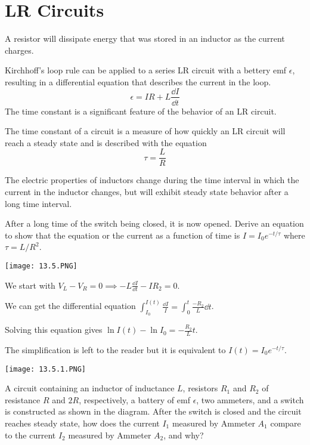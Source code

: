 \documentclass[../em.tex]{subfiles}
\begin{document}
\section{LR Circuits}
A resistor will dissipate energy that was stored in an inductor as the current charges.

Kirchhoff's loop rule can be applied to a series LR circuit with a bettery emf $\epsilon$, resulting in a differential equation that describes the current in the loop.
\[ \epsilon = IR + L\frac{\dd I}{\dd t}\]
The time constant is a significant feature of the behavior of an LR circuit.

The time constant of a circuit is a measure of how quickly an LR circuit will reach a steady state and is described with the equation 
\[ \tau = \frac{L}{R}\]

The electric properties of inductors change during the time interval in which the current in the inductor changes, but will 
exhibit steady state behavior after a long time interval.

\begin{example}
    After a long time of the switch being closed, it is now opened. Derive an equation to show that the equation or the current as a function of time is $I=I_0e^{-t/\tau}$ where $\tau=L/R^2$.
    \begin{center}
        \texttt{[image: 13.5.PNG]}
    \end{center}

    We start with $V_L-V_R = 0 \implies -L\frac{\dd I}{\dd t}-IR_2=0$.

    We can get the differential equation $\int_{I_0}^{I(t)}\frac{\dd I}{I}=\int_0^t \frac{-R_2}{L}\dd t$.
    
    Solving this equation gives $\ln I(t)-\ln I_0=-\frac{R_2}{L}t$.

    The simplification is left to the reader but it is equivalent to $I(t)=I_0e^{-t/\tau}$.
\end{example}

\ex \begin{center}
    \texttt{[image: 13.5.1.PNG]}
\end{center}
A circuit containing an inductor of inductance $L$, resistors $R_1$ and $R_2$ of resistance $R$ and $2R$, respectively, a battery of emf $\epsilon$, two ammeters, and a switch is constructed as shown in the diagram.
After the switch is closed and the circuit reaches steady state, how does the current $I_1$ measured by Ammeter $A_1$ compare to the current $I_2$ measured by Ammeter $A_2$, and why?
\end{document}
